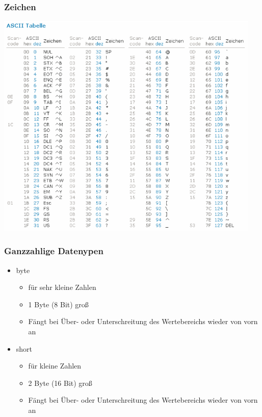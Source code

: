 \begin{frame}[fragile]
	\frametitle{Zeichen}
	\center
	\includegraphics[width=0.95\textwidth,
	keepaspectratio=true]{bilder/ascii_table.png}
\end{frame}

\begin{frame}[fragile]
	\frametitle{Ganzzahlige Datenypen}
			\begin{itemize}
			  \item byte
			  \begin{itemize}
			    \item für sehr kleine Zahlen
			  	\item 1 Byte (8 Bit) groß
			  	\item Fängt bei Über- oder Unterschreitung des Wertebereichs wieder von
			  	vorn an
			  \end{itemize}
			  \item short
			  \begin{itemize}
			    \item für kleine Zahlen
			  	\item 2 Byte (16 Bit) groß
			  	\item Fängt bei Über- oder Unterschreitung des Wertebereichs wieder von
			  	vorn an
			  \end{itemize}
			\end{itemize}
\end{frame}

